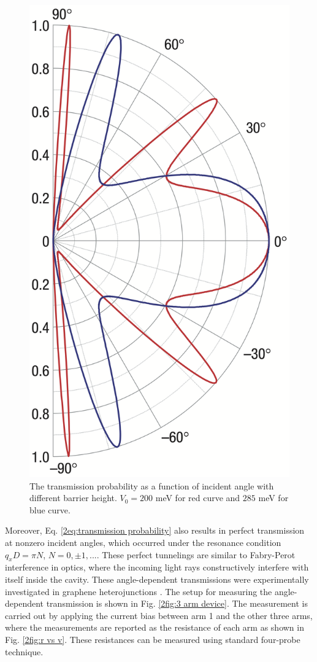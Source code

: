     \begin{figure}[H]
        \centering
        \includegraphics[width = 0.3\linewidth]{fig/Chap 2/klein tunneling.png}
        \caption{The transmission probability as a function of incident angle with different barrier height. 
                    $V_0 = 200$ meV for red curve and $285$ meV for blue curve.}
        \label{2fig:Klein tunneling}
    \end{figure}
    Moreover, Eq. \ref{2eq:transmission probability} also results in perfect transmission at nonzero incident angles, which occurred under the resonance condition $q_x D = \pi N$, $N = 0, \pm 1,...$.
    These perfect tunnelings are similar to Fabry-Perot interference in optics, where the incoming light rays constructively interfere with itself inside the cavity.
    These angle-dependent transmissions were experimentally investigated in graphene heterojunctions \cite{Rahman2015}.
    The setup for measuring the angle-dependent transmission is shown in Fig. \ref{2fig:3 arm device}.
    The measurement is carried out by applying the current bias between arm 1 and the other three arms, where the measurements are reported as the resistance of each arm as shown in Fig. \ref{2fig:r vs v}.
    These resistances  can be measured using standard four-probe technique.

